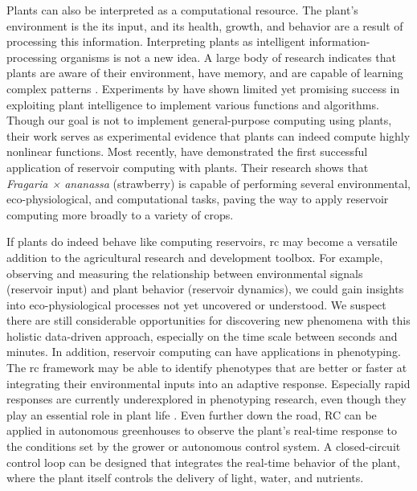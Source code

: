 Plants can also be interpreted as a computational resource.
The plant's environment is the its input, and its health, growth, and behavior are a result of processing this information.
Interpreting plants as intelligent information-processing organisms is not a new idea.
A large body of research indicates that plants are aware of their environment, have memory, and are capable of learning complex patterns \citep{mancuso_revolutionary_2018}. 
Experiments by \citet{stepney_computers_2018} have shown limited yet promising success in exploiting plant intelligence to implement various functions and algorithms.
Though our goal is not to implement general-purpose computing using plants, their work serves as experimental evidence that plants can indeed compute highly nonlinear functions.
Most recently, \citet{pieters_plants_2021} have demonstrated the first successful application of reservoir computing with plants. 
Their research shows that \textit{Fragaria × ananassa} (strawberry) is capable of performing several environmental, eco-physiological, and computational tasks, paving the way to apply reservoir computing more broadly to a variety of crops.


If plants do indeed behave like computing reservoirs, \acrshort{rc} may become a versatile addition to the agricultural research and development toolbox.
For example, observing and measuring the relationship between environmental signals (reservoir input) and plant behavior (reservoir dynamics), we could gain insights into eco-physiological processes not yet uncovered or understood.
We suspect there are still considerable opportunities for discovering new phenomena with this holistic data-driven approach, especially on the time scale between seconds and minutes.
In addition, reservoir computing can have applications in phenotyping. 
The \acrshort{rc} framework may be able to identify phenotypes that are better or faster at integrating their environmental inputs into an adaptive response.
Especially rapid responses are currently underexplored in phenotyping research, even though they play an essential role in plant life \citep{alarcon_substantial_1994, de_swaef_plant_2015}.
Even further down the road, RC can be applied in autonomous greenhouses to observe the plant's real-time response to the conditions set by the grower or autonomous control system. 
A closed-circuit control loop can be designed that integrates the real-time behavior of the plant, where the plant itself controls the delivery of light, water, and nutrients.


